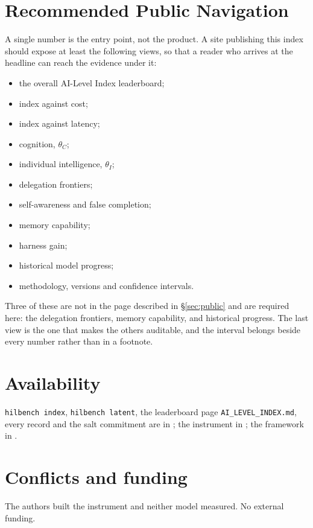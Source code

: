 \documentclass[11pt]{article}
\theoremstyle{definition}
\begin{document}
\section{Recommended Public Navigation}\label{app:navigation}

A single number is the entry point, not the product. A site publishing this index should
expose at least the following views, so that a reader who arrives at the headline can
reach the evidence under it:

\begin{itemize}\itemsep2pt
\item the overall AI-Level Index leaderboard;
\item index against cost;
\item index against latency;
\item cognition, $\theta_C$;
\item individual intelligence, $\theta_I$;
\item delegation frontiers;
\item self-awareness and false completion;
\item memory capability;
\item harness gain;
\item historical model progress;
\item methodology, versions and confidence intervals.
\end{itemize}

\noindent Three of these are not in the page described in \S\ref{sec:public} and are
required here: the delegation frontiers, memory capability, and historical progress. The
last view is the one that makes the others auditable, and the interval belongs beside every
number rather than in a footnote.

\section*{Availability}
\texttt{hilbench index}, \texttt{hilbench latent}, the leaderboard page \texttt{AI\_LEVEL\_INDEX.md}, every record and the salt commitment are in \citet{yang2026hilbench}; the instrument in \citet{yang2026hilbenchpaper}; the framework in \citet{yang2026unified}.

\section*{Conflicts and funding}
The authors built the instrument and neither model measured. No external funding.



\end{document}
